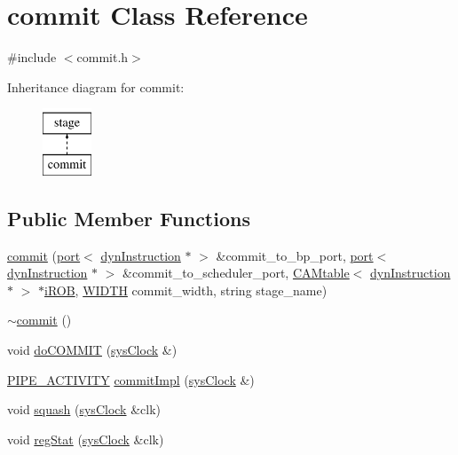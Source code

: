 \hypertarget{classcommit}{
\section{commit Class Reference}
\label{classcommit}
}


{\ttfamily \#include $<$commit.h$>$}

Inheritance diagram for commit:\begin{figure}[H]
\begin{center}
\leavevmode
\includegraphics[height=2.000000cm]{classcommit}
\end{center}
\end{figure}
\subsection*{Public Member Functions}
\begin{DoxyCompactItemize}
\item 
\hyperlink{classcommit_a41ac90052f6ff381357d12a0b30583a8}{commit} (\hyperlink{classport}{port}$<$ \hyperlink{classdynInstruction}{dynInstruction} $\ast$ $>$ \&commit\_\-to\_\-bp\_\-port, \hyperlink{classport}{port}$<$ \hyperlink{classdynInstruction}{dynInstruction} $\ast$ $>$ \&commit\_\-to\_\-scheduler\_\-port, \hyperlink{classCAMtable}{CAMtable}$<$ \hyperlink{classdynInstruction}{dynInstruction} $\ast$ $>$ $\ast$\hyperlink{backend_2parser_8cpp_ad73ae25f81e6e99482f3fbd5ba9664ce}{iROB}, \hyperlink{global_2global_8h_a6fa2e24b8a418fa215e183264cbea3aa}{WIDTH} commit\_\-width, string stage\_\-name)
\item 
\hyperlink{classcommit_a56b8656334cc14f0f7c9f8f0d7021417}{$\sim$commit} ()
\item 
void \hyperlink{classcommit_a9eb2bb492ac2b103102be4ef7d018e8b}{doCOMMIT} (\hyperlink{classsysClock}{sysClock} \&)
\item 
\hyperlink{unit_2stage_8h_ab00e4188e8b8974fecb1dfd12764cbb1}{PIPE\_\-ACTIVITY} \hyperlink{classcommit_a50f823d551a57bbaccde41c32737b737}{commitImpl} (\hyperlink{classsysClock}{sysClock} \&)
\item 
void \hyperlink{classcommit_afb05caa27f671bb59e3462e161c2c2f1}{squash} (\hyperlink{classsysClock}{sysClock} \&clk)
\item 
void \hyperlink{classcommit_a207fab9b88bbf27cae6f6388aa6ef6ad}{regStat} (\hyperlink{classsysClock}{sysClock} \&clk)
\end{DoxyCompactItemize}


